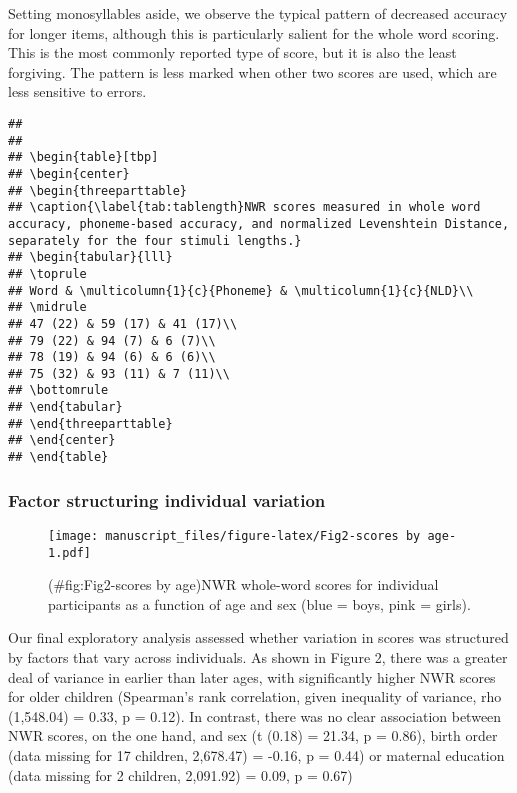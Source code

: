 \documentclass[english,,man,floatsintext]{apa6}
\begin{document}
Setting monosyllables aside, we observe the typical pattern of decreased
accuracy for longer items, although this is particularly salient for the
whole word scoring. This is the most commonly reported type of score,
but it is also the least forgiving. The pattern is less marked when
other two scores are used, which are less sensitive to errors.

\begin{verbatim}
## 
## 
## \begin{table}[tbp]
## \begin{center}
## \begin{threeparttable}
## \caption{\label{tab:tablength}NWR scores measured in whole word accuracy, phoneme-based accuracy, and normalized Levenshtein Distance, separately for the four stimuli lengths.}
## \begin{tabular}{lll}
## \toprule
## Word & \multicolumn{1}{c}{Phoneme} & \multicolumn{1}{c}{NLD}\\
## \midrule
## 47 (22) & 59 (17) & 41 (17)\\
## 79 (22) & 94 (7) & 6 (7)\\
## 78 (19) & 94 (6) & 6 (6)\\
## 75 (32) & 93 (11) & 7 (11)\\
## \bottomrule
## \end{tabular}
## \end{threeparttable}
## \end{center}
## \end{table}
\end{verbatim}

\subsubsection{Factor structuring individual
variation}\label{factor-structuring-individual-variation}

\begin{figure}
\centering
\texttt{[image: manuscript\_files/figure-latex/Fig2-scores by age-1.pdf]}
\caption{(\#fig:Fig2-scores by age)NWR whole-word scores for individual
participants as a function of age and sex (blue = boys, pink = girls).}
\end{figure}

Our final exploratory analysis assessed whether variation in scores was
structured by factors that vary across individuals. As shown in Figure
2, there was a greater deal of variance in earlier than later ages, with
significantly higher NWR scores for older children (Spearman's rank
correlation, given inequality of variance, rho (1,548.04) = 0.33, p =
0.12). In contrast, there was no clear association between NWR scores,
on the one hand, and sex (t (0.18) = 21.34, p = 0.86), birth order (data
missing for 17 children, 2,678.47) = -0.16, p = 0.44) or maternal
education (data missing for 2 children, 2,091.92) = 0.09, p = 0.67)
\end{document}
